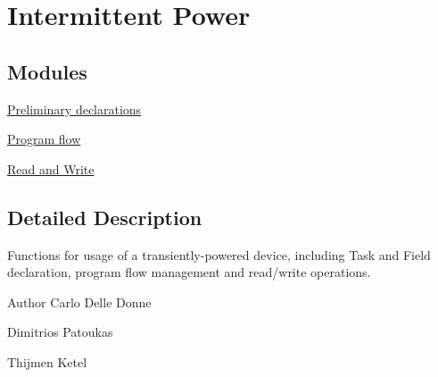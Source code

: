 \hypertarget{group__interpow__api}{}\section{Intermittent Power}
\label{group__interpow__api}
\subsection*{Modules}
\begin{DoxyCompactItemize}
\item 
\hyperlink{group__interpow__declaration}{Preliminary declarations}
\item 
\hyperlink{group__interpow__flow}{Program flow}
\item 
\hyperlink{group__interpow__read__write}{Read and Write}
\end{DoxyCompactItemize}


\subsection{Detailed Description}
Functions for usage of a transiently-\/powered device, including Task and Field declaration, program flow management and read/write operations.

\begin{DoxyAuthor}{Author}
Carlo Delle Donne 

Dimitrios Patoukas 

Thijmen Ketel 
\end{DoxyAuthor}
